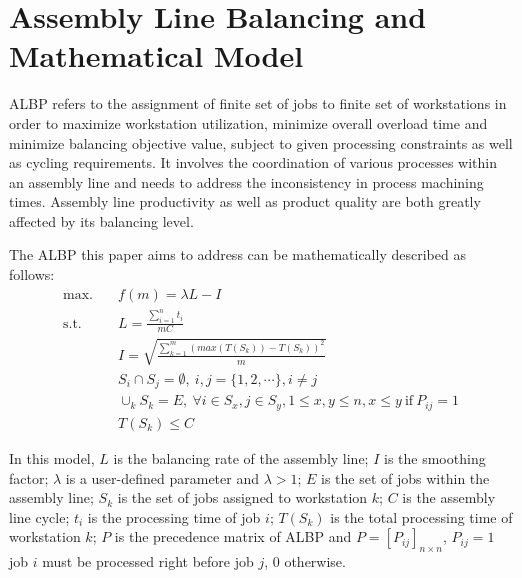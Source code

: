 \section{Assembly Line Balancing and Mathematical Model}
ALBP refers to the assignment of finite set of jobs to finite set of workstations in order to maximize workstation utilization, minimize overall overload time and minimize balancing objective value, subject to given processing constraints as well as cycling requirements.
It involves the coordination of various processes within an assembly line and needs to address the inconsistency in process machining times.
Assembly line productivity as well as product quality are both greatly affected by its balancing level.

The ALBP this paper aims to address can be mathematically described as follows:
\begin{align}
	\text{max.} \quad & f(m) = \lambda L - I \\
	\text{s.t.}  \quad & L = \frac{\sum_{i=1}^{n} t_i}{mC} \\
	& I = \sqrt{\frac{\sum_{k=1}^{m} (max(T(S_k)) - T(S_k))^2}{m}} \\
	& S_i \cap S_j = \emptyset, \ i, j = \{1, 2, \cdots\}, i \neq j \\
	& \cup_k S_k = E, \ \forall i \in S_x, j \in S_y, 1 \leq x, y \leq n, x \leq y \  \text{if} \  P_{ij} = 1 \\
	& T(S_k) \leq C 
\end{align}

In this model, $L$ is the balancing rate of the assembly line; $I$ is the smoothing factor; $\lambda$ is a user-defined parameter and $\lambda > 1$; $E$ is the set of jobs within the assembly line; $S_k$ is the set of jobs assigned to workstation $k$; $C$ is the assembly line cycle; $t_i$ is the processing time of job $i$; $T(S_k)$ is the total processing time of workstation $k$; $P$ is the precedence matrix of ALBP and $P = [P_{ij}]_{n\times n}$, $P_{ij} = 1$ job $i$ must be processed right before job $j$, 0 otherwise.